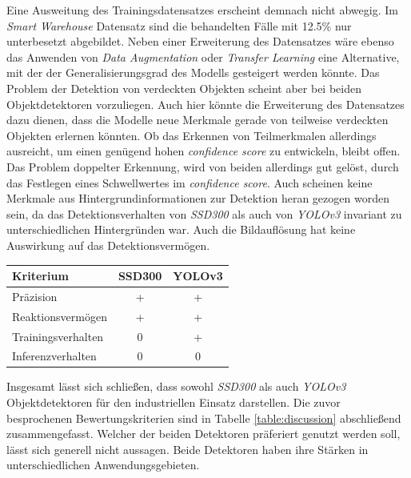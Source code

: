 Eine Ausweitung des Trainingsdatensatzes erscheint demnach nicht abwegig. Im \textit{Smart Warehouse} Datensatz sind die behandelten Fälle mit 12.5\% nur unterbesetzt abgebildet. Neben einer Erweiterung des Datensatzes wäre ebenso das Anwenden von \textit{Data Augmentation} oder \textit{Transfer Learning} eine Alternative, mit der der Generalisierungsgrad des Modells gesteigert werden könnte. Das Problem der Detektion von verdeckten Objekten scheint aber bei beiden Objektdetektoren vorzuliegen. Auch hier könnte die Erweiterung des Datensatzes dazu dienen, dass die Modelle neue Merkmale gerade von teilweise verdeckten Objekten erlernen könnten. Ob das Erkennen von Teilmerkmalen allerdings ausreicht, um einen genügend hohen \textit{confidence score} zu entwickeln, bleibt offen. Das Problem doppelter Erkennung, wird von beiden allerdings gut gelöst, durch das Festlegen eines Schwellwertes im \textit{confidence score}. Auch scheinen keine Merkmale aus Hintergrundinformationen zur Detektion heran gezogen worden sein, da das Detektionsverhalten von \textit{SSD300} als auch von \textit{YOLOv3} invariant zu unterschiedlichen Hintergründen war. Auch die Bildauflösung hat keine Auswirkung auf das Detektionsvermögen.

\begin{center}
	\begin{tabular}[H]{l|c|c}
		Kriterium & SSD300 & YOLOv3 \\
		\hline
		Präzision & + & + \\
		Reaktionsvermögen & + & + \\
		Trainingsverhalten & 0 & + \\
		Inferenzverhalten & 0 & 0 \\
	\end{tabular}
	\label{table:discussion}
\end{center}

Insgesamt lässt sich schließen, dass sowohl \textit{SSD300} als auch \textit{YOLOv3} Objektdetektoren für den industriellen Einsatz darstellen. Die zuvor besprochenen Bewertungskriterien sind in Tabelle \ref{table:discussion} abschließend zusammengefasst. Welcher der beiden Detektoren präferiert genutzt werden soll, lässt sich generell nicht aussagen. Beide Detektoren haben ihre Stärken in unterschiedlichen Anwendungsgebieten. 


